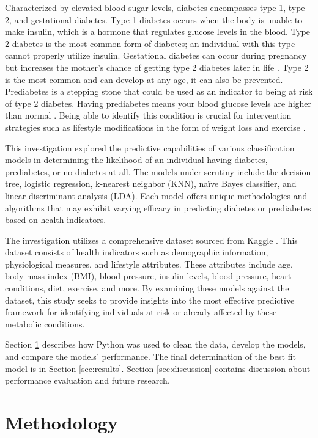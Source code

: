 \documentclass[journal]{IEEEtran}
\begin{document}
Characterized by elevated blood sugar levels, diabetes encompasses type 1, type 2, and gestational diabetes. Type 1 diabetes occurs when the body is unable to make insulin, which is a hormone that regulates glucose levels in the blood. Type 2 diabetes is the most common form of diabetes; an individual with this type cannot properly utilize insulin. Gestational diabetes can occur during pregnancy but increases the mother's chance of getting type 2 diabetes later in life \cite{b1}. Type 2 is the most common and can develop at any age, it can also be prevented. Prediabetes is a stepping stone that could be used as an indicator to being at risk of type 2 diabetes. Having prediabetes means your blood glucose levels are higher than normal \cite{b1}. Being able to identify this condition is crucial for intervention strategies such as lifestyle modifications in the form of weight loss and exercise \cite{b2}. 

This investigation explored the predictive capabilities of various classification models in determining the likelihood of an individual having diabetes, prediabetes, or no diabetes at all. The models under scrutiny include the decision tree, logistic regression, k-nearest neighbor (KNN), naïve Bayes classifier, and linear discriminant analysis (LDA). Each model offers unique methodologies and algorithms that may exhibit varying efficacy in predicting diabetes or prediabetes based on health indicators.

The investigation utilizes a comprehensive dataset sourced from Kaggle \cite{b3}. This dataset consists of health indicators such as demographic information, physiological measures, and lifestyle attributes. These attributes include age, body mass index (BMI), blood pressure, insulin levels, blood pressure, heart conditions, diet, exercise, and more. By examining these models against the dataset, this study seeks to provide insights into the most effective predictive framework for identifying individuals at risk or already affected by these metabolic conditions.

Section \ref{sec:methodology} describes how Python was used to clean the data, develop the models, and compare the models' performance. The final determination of the best fit model is in Section \ref{sec:results}. Section \ref{sec:discussion} contains discussion about performance evaluation and future research. 

\section{Methodology}
\label{sec:methodology}
\end{document}
